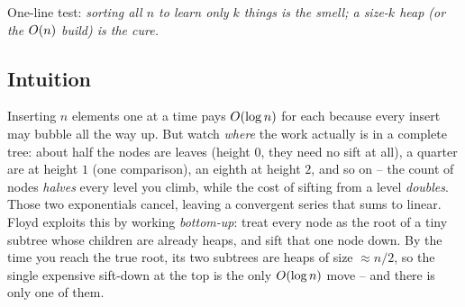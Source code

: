 \begin{recognitionbox}
One-line test: \emph{sorting all $n$ to learn only $k$ things is the smell; a size-$k$ heap (or the
$O(n)$ build) is the cure.}
\end{recognitionbox}

\subsection{Intuition}

Inserting $n$ elements one at a time pays $O(\log n)$ for each because every insert may bubble all the
way up. But watch \emph{where} the work actually is in a complete tree: about half the nodes are leaves
(height $0$, they need no sift at all), a quarter are at height $1$ (one comparison), an eighth at height
$2$, and so on -- the count of nodes \emph{halves} every level you climb, while the cost of sifting from a
level \emph{doubles}. Those two exponentials cancel, leaving a convergent series that sums to linear. Floyd
exploits this by working \emph{bottom-up}: treat every node as the root of a tiny subtree whose children are
already heaps, and sift that one node down. By the time you reach the true root, its two subtrees are heaps
of size $\approx n/2$, so the single expensive sift-down at the top is the only $O(\log n)$ move -- and
there is only one of them.

